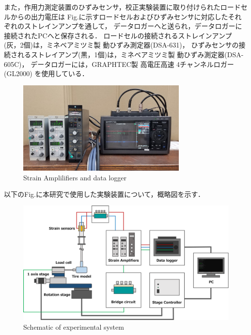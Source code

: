 \newpage

また，作用力測定装置のひずみセンサ，校正実験装置に取り付けられたロードセルからの出力電圧は
Fig.に示すロードセルおよびひずみセンサに対応したそれぞれのストレインアンプを通して，
データロガーへと送られ，データロガーに接続されたPCへと保存される．
ロードセルの接続されるストレインアンプ(灰，2個)は，ミネベアミツミ製 動ひずみ測定器(DSA-631)，
ひずみセンサの接続されるストレイアンプ(黒，1個)は，ミネベアミツミ製 動ひずみ測定器(DSA-605C)，
データロガーには，GRAPHTEC製 高電圧高速 4チャンネルロガー(GL2000) を使用している．

\begin{figure}[htbp]
    \footnotesize
    \begin{center}
        \includegraphics[width=85mm]{images/22-5.png}
        \caption{Strain Amplilifiers and data logger}
    \end{center}
\end{figure}

以下のFig.に本研究で使用した実験装置について，概略図を示す．

\begin{figure}[htbp]
    \footnotesize
    \begin{center}
        \includegraphics[width=140mm]{images/22-6.png}
        \caption{Schematic of experimental system}
    \end{center}
\end{figure}